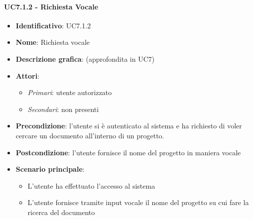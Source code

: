 \paragraph{UC7.1.2 - Richiesta Vocale}
\begin{itemize}
   \item \textbf{Identificativo}: UC7.1.2
   \item \textbf{Nome}: Richiesta vocale
   \item \textbf{Descrizione grafica}: (approfondita in UC7)
   \item \textbf{Attori}:
   \begin{itemize} 
       \item \textit{Primari}: utente autorizzato
       \item \textit{Secondari}: non presenti
   \end{itemize}
       \item \textbf{Precondizione}: l'utente si è autenticato al sistema e ha richiesto di voler cercare un documento all'interno di un progetto.
       \item \textbf{Postcondizione}: l'utente fornisce il nome del progetto in maniera vocale
    \item \textbf{Scenario principale}: 
       \begin{itemize}
           \item L'utente ha effettuato l'accesso al sistema 
           \item L'utente fornisce tramite input vocale il nome del progetto su cui fare la ricerca del documento
       \end{itemize}
\end{itemize}

